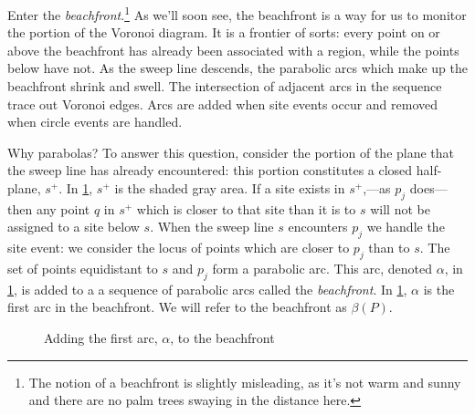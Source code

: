 \documentclass[12pt,twoside]{reedthesis}
\begin{document}
        Enter the \emph{beachfront}.\footnote{The notion of a beachfront is slightly misleading, as it's not warm and sunny and there are no palm trees swaying in the distance here.} As we'll soon see, the beachfront is a way for us to monitor the  portion of the Voronoi diagram. It is a frontier of sorts: every point on or above the beachfront has already been associated with a region, while the points below have not. As the sweep line descends, the parabolic arcs which make up the beachfront shrink and swell. The intersection of adjacent arcs in the sequence trace out Voronoi edges. Arcs are added when site events occur and removed when circle events are handled.\par

        Why parabolas? To answer this question, consider the portion of the plane that the sweep line has already encountered: this portion constitutes a closed half-plane, $s^+$. In \cref{fig:beachfront_se}, $s^+$ is the shaded gray area. If a site exists in $s^+$,---as $p_{j}$ does--- then any point $q$ in $s^+$ which is closer to that site than it is to $s$ will not be assigned to a site below $s$. When the sweep line $s$ encounters $p_{j}$ we handle the site event: we consider the locus of points which are closer to $p_{j}$ than to $s$. The set of points equidistant to $s$ and $p_{j}$ form a parabolic arc. This arc, denoted $\alpha$, in \cref{fig:beachfront_se}, is added to a a sequence of parabolic arcs called the \emph{beachfront}. In \cref{fig:beachfront_se}, $\alpha$ is the first arc in the beachfront. We will refer to the beachfront as $\beta(P)$. \par


        \begin{figure}[!h]        
          \centering
          
          \caption{Adding the first arc, $\alpha$, to the beachfront}
          \label{fig:beachfront_se}
        \end{figure}
\end{document}
